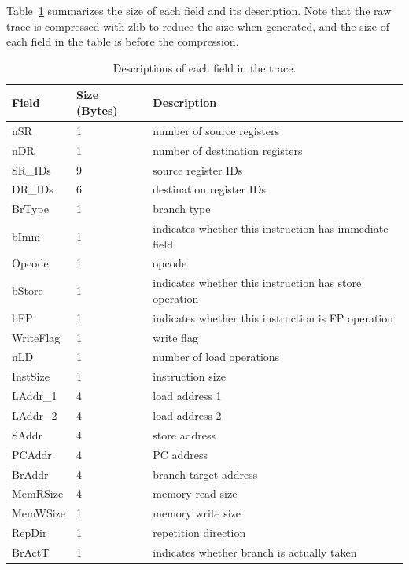 Table~\ref{table:trace_desc} summarizes the size of each field and its description.
Note that the raw trace is compressed with zlib to reduce the size when generated, and
the size of each field in the table is before the compression.

\begin{table}[htb]
\begin{footnotesize}
\begin{center}
\caption{Descriptions of each field in the trace.}
\label{table:trace_desc}
\begin{tabular}{|l|l|l|} 
\hline
Field     & Size (Bytes)       & Description \\ \hline \hline
nSR       & 1                  & number of source registers \\ \hline
nDR       & 1                  & number of destination registers \\ \hline
SR\_IDs   & 9                  & source register IDs \\ \hline
DR\_IDs   & 6                  & destination register IDs \\ \hline
BrType    & 1                  & branch type \\ \hline
bImm      & 1                  & indicates whether this instruction has immediate field \\ \hline
Opcode    & 1                  & opcode \\ \hline
bStore    & 1                  & indicates whether this instruction has store operation \\ \hline
bFP       & 1                  & indicates whether this instruction is FP operation \\ \hline
WriteFlag & 1                  & write flag \\ \hline
nLD       & 1                  & number of load operations \\ \hline
InstSize  & 1                  & instruction size \\ \hline
LAddr\_1  & 4                  & load address 1 \\ \hline
LAddr\_2  & 4                  & load address 2 \\ \hline
SAddr     & 4                  & store address \\ \hline
PCAddr    & 4                  & PC address \\ \hline
BrAddr    & 4                  & branch target address \\ \hline
MemRSize  & 4                  & memory read size \\ \hline
MemWSize  & 1                  & memory write size \\ \hline
RepDir    & 1                  & repetition direction  \\ \hline
BrActT    & 1                  & indicates whether branch is actually taken \\ \hline

\end{tabular}
\end{center}
\end{footnotesize}
\end{table}

